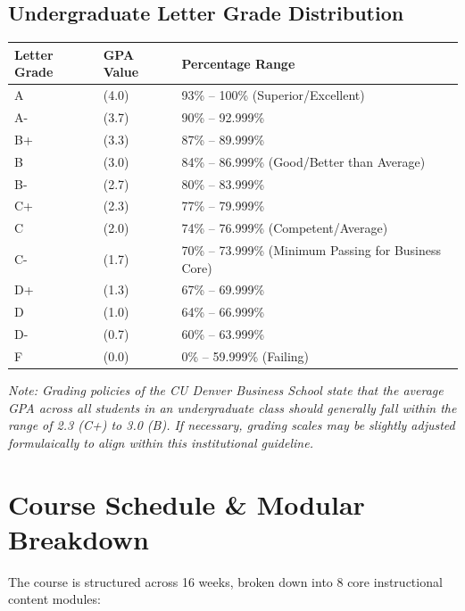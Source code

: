 \documentclass[11pt,a4paper]{article}
\begin{document}
\subsection*{Undergraduate Letter Grade Distribution}
\begin{center}
    \begin{tabular}{llp{7cm}}
        \toprule
        \textbf{Letter Grade} & \textbf{GPA Value} & \textbf{Percentage Range} \\
        \midrule
        A  & (4.0) & 93\% -- 100\% (Superior/Excellent) \\
        A- & (3.7) & 90\% -- 92.999\% \\
        B+ & (3.3) & 87\% -- 89.999\% \\
        B  & (3.0) & 84\% -- 86.999\% (Good/Better than Average) \\
        B- & (2.7) & 80\% -- 83.999\% \\
        C+ & (2.3) & 77\% -- 79.999\% \\
        C  & (2.0) & 74\% -- 76.999\% (Competent/Average) \\
        C- & (1.7) & 70\% -- 73.999\% (Minimum Passing for Business Core) \\
        D+ & (1.3) & 67\% -- 69.999\% \\
        D  & (1.0) & 64\% -- 66.999\% \\
        D- & (0.7) & 60\% -- 63.999\% \\
        F  & (0.0) & 0\% -- 59.999\% (Failing) \\
        \bottomrule
    \end{tabular}
\end{center}
\textit{Note: Grading policies of the CU Denver Business School state that the average GPA across all students in an undergraduate class should generally fall within the range of 2.3 (C+) to 3.0 (B). If necessary, grading scales may be slightly adjusted formulaically to align within this institutional guideline.}

\section*{Course Schedule \& Modular Breakdown}
The course is structured across 16 weeks, broken down into 8 core instructional content modules:
\end{document}
